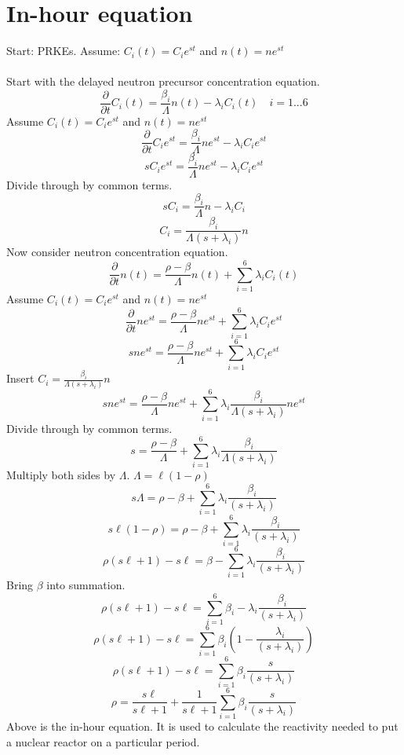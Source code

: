 \documentclass[]{article}
\begin{document}
		\section*{\textbf{In-hour equation}} Start: PRKEs. Assume: $C_i(t) =C_ie^{st}$ and $n(t) =ne^{st}$\\\\
		Start with the delayed neutron precursor concentration equation.
		\[
		\frac{\partial}{\partial t}C_i(t) =\frac{\beta_i}{\Lambda}n(t)-\lambda_iC_i(t) \quad i=1...6
		\]
		Assume $C_i(t) =C_ie^{st}$ and $n(t) =ne^{st}$
		\[
		\frac{\partial}{\partial t}C_ie^{st} =\frac{\beta_i}{\Lambda}ne^{st}-\lambda_iC_ie^{st}
		\]
		\[
		sC_ie^{st} =\frac{\beta_i}{\Lambda}ne^{st}-\lambda_iC_ie^{st}
		\]
		Divide through by common terms.
		\[
		sC_i =\frac{\beta_i}{\Lambda}n-\lambda_iC_i
		\]
		\[
		C_i =\frac{\beta_i}{\Lambda(s+\lambda_i)}n
		\]
		Now consider neutron concentration equation.
		\[
		\frac{\partial}{\partial t}n(t)= \frac{\rho-\beta}{\Lambda}n(t)+\sum_{i=1}^{6}\lambda_i C_i(t)
		\]
		Assume $C_i(t) =C_ie^{st}$ and $n(t) =ne^{st}$
		\[
		\frac{\partial}{\partial t}ne^{st}= \frac{\rho-\beta}{\Lambda}ne^{st}+\sum_{i=1}^{6}\lambda_i C_ie^{st}
		\]
		\[
		sne^{st}= \frac{\rho-\beta}{\Lambda}ne^{st}+\sum_{i=1}^{6}\lambda_i C_ie^{st}
		\]
		Insert $C_i =\frac{\beta_i}{\Lambda(s+\lambda_i)}n$
		\[
		sne^{st}= \frac{\rho-\beta}{\Lambda}ne^{st}+\sum_{i=1}^{6}\lambda_i \frac{\beta_i}{\Lambda(s+\lambda_i)}ne^{st}
		\]
		Divide through by common terms.
		\[
		s= \frac{\rho-\beta}{\Lambda}+\sum_{i=1}^{6}\lambda_i \frac{\beta_i}{\Lambda(s+\lambda_i)}
		\]
		Multiply both sides by $\Lambda$. $\Lambda = \ell(1-\rho)$
		\[
		s\Lambda= \rho-\beta+\sum_{i=1}^{6}\lambda_i \frac{\beta_i}{(s+\lambda_i)}
		\]
		\[
		s\ell(1-\rho)= \rho-\beta+\sum_{i=1}^{6}\lambda_i \frac{\beta_i}{(s+\lambda_i)}
		\]
		\[
		\rho(s\ell+1)-s\ell= \beta-\sum_{i=1}^{6}\lambda_i \frac{\beta_i}{(s+\lambda_i)}
		\]
		Bring $\beta$ into summation.
		\[
		\rho(s\ell+1)-s\ell= \sum_{i=1}^{6}\beta_i-\lambda_i \frac{\beta_i}{(s+\lambda_i)}
		\]
		\[
		\rho(s\ell+1)-s\ell= \sum_{i=1}^{6}\beta_i\left(1-\frac{\lambda_i}{(s+\lambda_i)}\right)
		\]
		\[
		\rho(s\ell+1)-s\ell= \sum_{i=1}^{6}\beta_i\frac{s}{(s+\lambda_i)}
		\]
		\[
		\rho=\frac{s\ell}{s\ell+1}+ \frac{1}{s\ell+1}\sum_{i=1}^{6}\beta_i\frac{s}{(s+\lambda_i)}
		\]
		Above is the in-hour equation. It is used to calculate the reactivity needed to put a nuclear reactor on a particular period.
		
		
\end{document}
